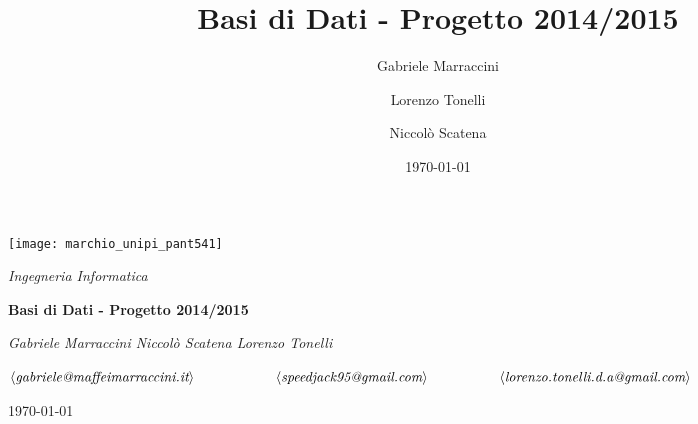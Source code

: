 \title{Basi di Dati - Progetto 2014/2015}
\author{Gabriele Marraccini \and Lorenzo Tonelli \and Niccolò Scatena}
\date{\today}


\begin{titlepage}
\centering
    \texttt{[image: marchio\_unipi\_pant541]}\par\vspace{0.6cm}
    {\large\itshape Ingegneria Informatica\par}
    \vspace{2.5cm}
    {\Huge\bfseries Basi di Dati - Progetto 2014/2015\par}
    \vfill
    {\LARGE\itshape\setlength{\parindent}{-0.9cm} Gabriele Marraccini \hspace{1.2cm} Niccolò Scatena \hspace{1.5cm} Lorenzo Tonelli\par}\vspace{0.2cm}
    {\small\setlength{\parindent}{-0.2cm} \(\left\langle\textit{gabriele@maffeimarraccini.it}\right\rangle \hspace{2cm} \left\langle\textit{speedjack95@gmail.com}\right\rangle \hspace{1.75cm} \left\langle\textit{lorenzo.tonelli.d.a@gmail.com}\right\rangle\)\par}

    \vfill


    {\large \today\par}
\end{titlepage}

\restoregeometry
